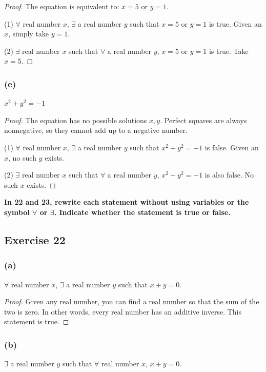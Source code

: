 \documentclass[14pt]{extarticle}
\newcommand{\fa}{\forall}
\newcommand{\te}{\exists}
\begin{document}
\begin{proof}
The equation is equivalent to: $x = 5$ or $y = 1$.

(1) $\fa$ real number $x$, $\te$ a real number $y$ such that $x = 5$ or $y = 1$ is true. Given an $x$, simply take $y = 1$.

(2) $\te$ real number $x$ such that $\fa$ a real number $y$, $x = 5$ or $y = 1$ is true. Take $x = 5$.
\end{proof}

\subsubsection{(e)}
$x^2 + y^2 = -1$

\begin{proof}
The equation has no possible solutions $x, y$. Perfect squares are always nonnegative, so they cannot add up to a negative number.

(1) $\fa$ real number $x$, $\te$ a real number $y$ such that $x^2 + y^2 = -1$ is false. Given an $x$, no such $y$ exists.

(2) $\te$ real number $x$ such that $\fa$ a real number $y$, $x^2 + y^2 = -1$ is also false. No such $x$ exists.
\end{proof}

{\bf \color{cyan} In 22 and 23, rewrite each statement without using variables or the symbol $\fa$ or $\te$. Indicate whether the statement is true or false.}

\subsection{Exercise 22}
\subsubsection{(a)}
$\fa$ real number $x$, $\te$ a real number $y$ such that $x + y = 0$.

\begin{proof}
Given any real number, you can find a real number so that the sum of the two is zero. In other words, every real number has an additive inverse. This statement is true.
\end{proof}

\subsubsection{(b)}
$\te$ a real number $y$ such that $\fa$ real number $x$, $x + y = 0$.
\end{document}
